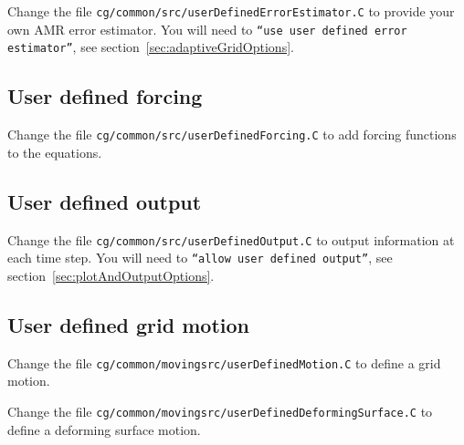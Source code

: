 Change the file {\tt cg/\-common/\-src/\-userDefinedErrorEstimator.C} to provide your own AMR error
estimator. 
You will need to {\tt ``use user defined error estimator''}, see section~\ref{sec:adaptiveGridOptions}.

\subsection{User defined forcing}\label{sec:userDefinedForcing}

Change the file {\tt cg/\-common/\-src/\-userDefinedForcing.C} to add forcing functions to the equations.

\subsection{User defined output}\label{sec:userDefinedOutput}

Change the file {\tt cg/\-common/\-src/\-userDefinedOutput.C} to output information at each time step.
You will need to {\tt ``allow user defined output''}, see section~\ref{sec:plotAndOutputOptions}.

\subsection{User defined grid motion}\label{sec:userDefinedGridMotion}

Change the file {\tt cg/common/movingsrc/userDefinedMotion.C} to define a grid motion.

Change the file {\tt cg/common/movingsrc/userDefinedDeformingSurface.C} to define a deforming surface motion.

